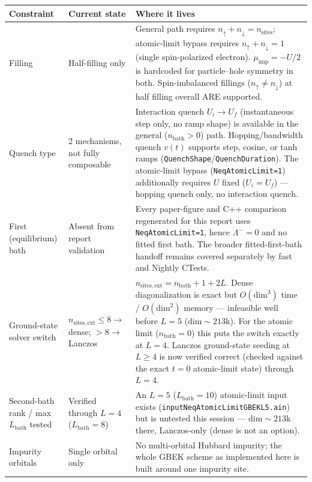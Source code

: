 \documentclass[11pt]{article}
\begin{document}
\begin{table}[H]
  \centering
  \small
  \begin{tabular}{p{3.1cm}p{3.4cm}p{7.5cm}}
    \toprule
    Constraint & Current state & Where it lives \\
    \midrule
    Filling &
    Half-filling only &
    General path requires $n_\uparrow+n_\downarrow=n_\mathrm{sites}$;
    atomic-limit bypass requires $n_\uparrow+n_\downarrow=1$ (single
    spin-polarized electron). $\mu_\mathrm{imp}=-U/2$ is hardcoded for
    particle--hole symmetry in both. Spin-imbalanced fillings
    ($n_\uparrow\neq n_\downarrow$) at half filling overall ARE
    supported. \\
    \addlinespace
    Quench type &
    2 mechanisms, not fully composable &
    Interaction quench $U_i\to U_f$ (instantaneous step only, no ramp
    shape) is available in the general ($n_\mathrm{bath}>0$) path.
    Hopping/bandwidth quench $v(t)$ supports step, cosine, or tanh ramps
    (\texttt{QuenchShape}/\texttt{QuenchDuration}). The atomic-limit
    bypass (\texttt{NeqAtomicLimit=1}) additionally requires $U$ fixed
    ($U_i=U_f$) --- hopping quench only, no interaction quench. \\
    \addlinespace
    First (equilibrium) bath &
    Absent from report validation &
    Every paper-figure and C++ comparison regenerated for this report uses
    \texttt{NeqAtomicLimit=1}, hence $\Lambda^-=0$ and no fitted first
    bath. The broader fitted-first-bath handoff remains covered separately
    by fast and Nightly CTests. \\
    \addlinespace
    Ground-state solver switch &
    $n_\mathrm{sites,ext}\le8\to$ dense; $>8\to$ Lanczos &
    $n_\mathrm{sites,ext}=n_\mathrm{bath}+1+2L$. Dense diagonalization is
    exact but $O(\mathrm{dim}^3)$ time / $O(\mathrm{dim}^2)$ memory ---
    infeasible well before $L=5$ ($\mathrm{dim}\sim213$k). For the
    atomic limit ($n_\mathrm{bath}=0$) this puts the switch exactly at
    $L=4$. Lanczos ground-state seeding at $L\ge4$ is now verified
    correct (checked against the exact $t=0$ atomic-limit state) through
    $L=4$. \\
    \addlinespace
    Second-bath rank / max $L_\mathrm{bath}$ tested &
    Verified through $L=4$ ($L_\mathrm{bath}=8$) &
    An $L=5$ ($L_\mathrm{bath}=10$) atomic-limit input exists
    (\texttt{inputNeqAtomicLimitGBEKL5.ain}) but is untested this
    session --- $\mathrm{dim}\sim213$k there, Lanczos-only (dense is not
    an option). \\
    \addlinespace
    Impurity orbitals &
    Single orbital only &
    No multi-orbital Hubbard impurity; the whole GBEK scheme as
    implemented here is built around one impurity site. \\
    \bottomrule
  \end{tabular}
\end{table}
\end{document}
